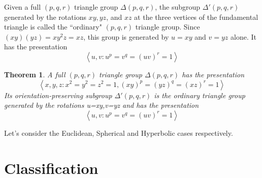 \documentclass{article}
\newtheorem{Thm}{Theorem}[section]
\begin{document}
Given a full $(p, q, r)$ triangle group $\Delta(p, q, r)$, the subgroup $\Delta'(p, q, r)$ generated by the rotations $x y, y z$, and $x z$ at the three vertices of the fundamental triangle is called the ``ordinary" $(p, q, r)$ triangle group. Since $(x y)(y z)=x y^2 z=x z$, this group is generated by $u=x y$ and $v=y z$ alone. It has the presentation
$$
    \left\langle u, v: u^p=v^q=(u v)^r=1\right\rangle
$$
\begin{Thm}
    A full $(p, q, r)$ triangle group $\Delta(p, q, r)$ has the presentation
    $$
        \left\langle x, y, z: x^2=y^2=z^2=1,(x y)^p=(y z)^q=(x z)^r=1\right\rangle
    $$
    Its orientation-preserving subgroup $\Delta'(p, q, r)$ is the ordinary triangle group generated by the rotations u=xy,v=yz and has the presentation
    $$\left\langle u,v:u^p=v^q=(uv)^r=1\right\rangle$$

\end{Thm}
Let's consider the Euclidean, Spherical and Hyperbolic cases respectively.
\section{Classification}
\end{document}
